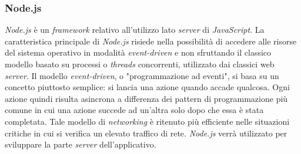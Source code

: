 \subsubsection{Node.js}
\textit{Node.js} è un \textit{framework} relativo all'utilizzo lato \textit{server} di \textit{JavaScript}.
La caratteristica principale di \textit{Node.js} risiede nella possibilità di accedere alle risorse del sistema operativo in modalità \textit{event-driven} e non sfruttando il classico modello basato su processi o \textit{threads} concorrenti, utilizzato dai classici web \textit{server}.
Il modello \textit{event-driven}, o "programmazione ad eventi", si basa su un concetto piuttosto semplice: si lancia una azione quando accade qualcosa. Ogni azione quindi risulta asincrona a differenza dei pattern di programmazione più comune in cui una azione succede ad un'altra solo dopo che essa è stata completata.
Tale modello di \textit{networking} è ritenuto più efficiente nelle situazioni critiche in cui si verifica un elevato traffico di rete.
\textit{Node.js} verrà utilizzato per sviluppare la parte \textit{server} dell'applicativo.
